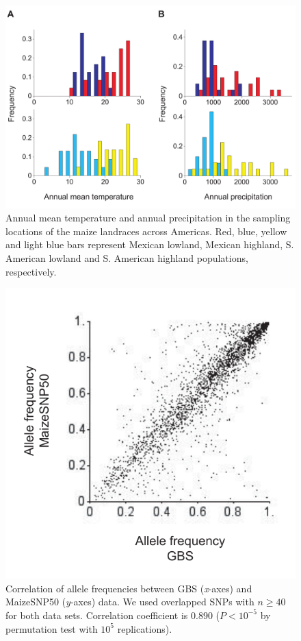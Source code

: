 \renewcommand{\arraystretch}{1}

\begin{figure}[h]
  \begin{center}
    \includegraphics[width=0.5\columnwidth]{fig/bioclm.pdf}
    \caption{Annual mean temperature and annual precipitation in the sampling locations of the maize landraces across Americas.
    Red, blue, yellow and light blue bars represent Mexican lowland, Mexican highland, S. American lowland and S. American highland
    populations, respectively.  
    }
    \label{supp:colfreq}
  \end{center}
\end{figure}

\begin{figure}[h]
  \begin{center}
    \includegraphics[width=0.4\columnwidth]{fig/col.pdf}
    \caption{Correlation of allele frequencies between GBS (\emph{x}-axes) and MaizeSNP50 (\emph{y}-axes) data.  We used overlapped SNPs with $n\geq40$ for both data sets.  Correlation coefficient is 0.890 ($P<10^{-5}$ by permutation test with $10^5$ replications).}
    \label{supp:correl_freq}
  \end{center}
\end{figure}

